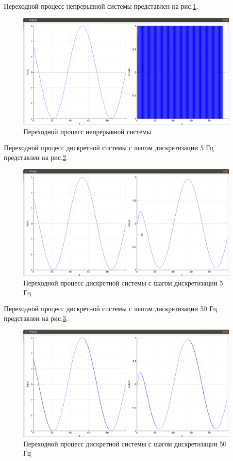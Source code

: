 \documentclass[14pt,a4paper]{extreport}
\begin{document}
Переходной процесс непрерывной системы 
представлен на рис.\ref{fig:contin}.
\begin{figure}[h]
    \centering
    \includegraphics[width=160mm]{img/cont.png}
    \caption{Переходной процесс непрерывной системы}
    \label{fig:contin}
\end{figure}

Переходной процесс дискретной системы с шагом дискретизации 
5 Гц представлен на рис.\ref{fig:discrete5}.

\begin{figure}[h]
    \centering
    \includegraphics[width=160mm]{img/5hz.png}
    \caption{Переходной процесс дискретной системы 
    с шагом дискретизации 5 Гц}
    \label{fig:discrete5}
\end{figure}

Переходной процесс дискретной системы с шагом дискретизации 
50 Гц представлен на рис.\ref{fig:discrete50}.

\begin{figure}[h]
    \centering
    \includegraphics[width=160mm]{img/50hz.png}
    \caption{Переходной процесс дискретной системы 
    с шагом дискретизации 50 Гц}
    \label{fig:discrete50}
\end{figure}
\end{document}
